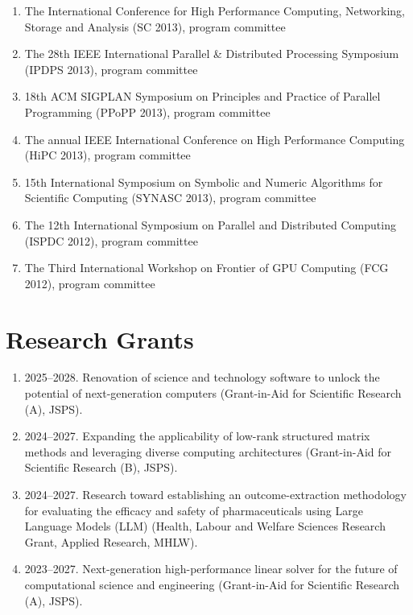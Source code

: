 \documentclass[margin,line]{cv}
\begin{document}
\begin{resume}
\begin{enumerate}
\item The International Conference for High Performance Computing, Networking, Storage and Analysis (SC 2013), program committee

\item The 28th IEEE International Parallel \& Distributed Processing Symposium (IPDPS 2013), program committee

\item 18th ACM SIGPLAN Symposium on Principles and Practice of Parallel Programming (PPoPP 2013), program committee

\item The annual IEEE International Conference on High Performance Computing (HiPC 2013), program committee

\item 15th International Symposium on Symbolic and Numeric Algorithms for Scientific Computing (SYNASC 2013), program committee

\item The 12th International Symposium on Parallel and Distributed Computing (ISPDC 2012), program committee

\item The Third International Workshop on Frontier of GPU Computing (FCG 2012), program committee

\end{enumerate}

\section{\sc Research Grants}
\begin{enumerate}
\item 2025--2028. Renovation of science and technology software to unlock the potential of next-generation computers (Grant-in-Aid for Scientific Research (A), JSPS).

\item 2024--2027. Expanding the applicability of low-rank structured matrix methods and leveraging diverse computing architectures (Grant-in-Aid for Scientific Research (B), JSPS).

\item 2024--2027. Research toward establishing an outcome-extraction methodology for evaluating the efficacy and safety of pharmaceuticals using Large Language Models (LLM) (Health, Labour and Welfare Sciences Research Grant, Applied Research, MHLW).

\item 2023--2027. Next-generation high-performance linear solver for the future of computational science and engineering (Grant-in-Aid for Scientific Research (A), JSPS).


\end{enumerate}
\end{resume}
\end{document}
